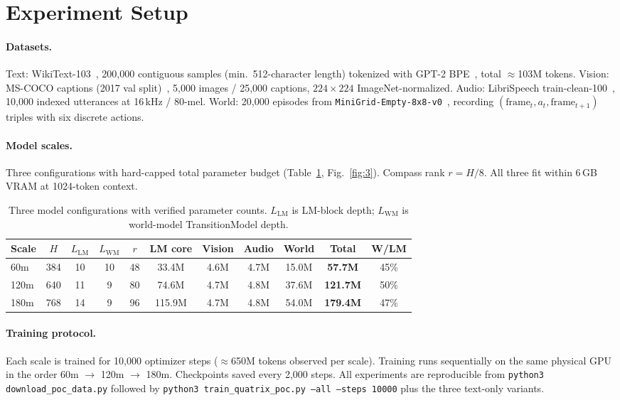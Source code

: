 \section{Experiment Setup}\label{sec:4}

\paragraph{Datasets.} Text: WikiText-103~\cite{ref19}, 200,000 contiguous samples (min.\ 512-character length) tokenized with GPT-2 BPE~\cite{ref4}, total $\approx$103M tokens. Vision: MS-COCO captions (2017 val split)~\cite{ref20}, 5,000 images / 25,000 captions, $224 \times 224$ ImageNet-normalized. Audio: LibriSpeech train-clean-100~\cite{ref21}, 10,000 indexed utterances at 16\,kHz / 80-mel. World: 20,000 episodes from \texttt{MiniGrid-Empty-8x8-v0}~\cite{ref22}, recording $(\mathrm{frame}_t, a_t, \mathrm{frame}_{t+1})$ triples with six discrete actions.

\paragraph{Model scales.} Three configurations with hard-capped total parameter budget (Table~\ref{tab:2}, Fig.~\ref{fig:3}). Compass rank $r = H/8$. All three fit within 6\,GB VRAM at 1024-token context.

\begin{table}[H]
\centering
\small
\begin{tabular}{lcccccccccc}
\toprule
Scale & $H$ & $L_{\mathrm{LM}}$ & $L_{\mathrm{WM}}$ & $r$ & LM core & Vision & Audio & World & Total & W/LM \\
\midrule
60m  & 384 & 10 & 10 & 48 & 33.4M  & 4.6M & 4.7M & 15.0M & \textbf{57.7M}  & 45\% \\
120m & 640 & 11 & 9  & 80 & 74.6M  & 4.7M & 4.8M & 37.6M & \textbf{121.7M} & 50\% \\
180m & 768 & 14 & 9  & 96 & 115.9M & 4.7M & 4.8M & 54.0M & \textbf{179.4M} & 47\% \\
\bottomrule
\end{tabular}
\caption{Three model configurations with verified parameter counts. $L_{\mathrm{LM}}$ is LM-block depth; $L_{\mathrm{WM}}$ is world-model TransitionModel depth.}
\label{tab:2}
\end{table}

\paragraph{Training protocol.} Each scale is trained for 10,000 optimizer steps ($\approx$650M tokens observed per scale). Training runs sequentially on the same physical GPU in the order 60m $\rightarrow$ 120m $\rightarrow$ 180m. Checkpoints saved every 2,000 steps. All experiments are reproducible from \texttt{python3 download\_poc\_data.py} followed by \texttt{python3 train\_quatrix\_poc.py --all --steps 10000} plus the three text-only variants.

